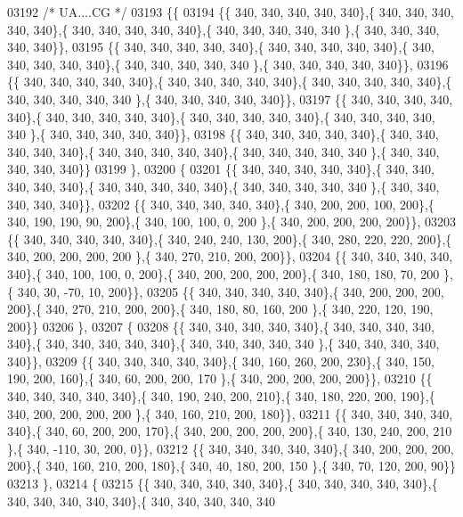 \begin{DoxyCode}
03192 \textcolor{comment}{/* UA....CG */}
03193 \{\{
03194 \{\{ 340, 340, 340, 340, 340\},\{ 340, 340, 340, 340, 340\},\{ 340, 340, 340, 340, 340\},\{ 340, 340, 340, 340, 340
      \},\{ 340, 340, 340, 340, 340\}\},
03195 \{\{ 340, 340, 340, 340, 340\},\{ 340, 340, 340, 340, 340\},\{ 340, 340, 340, 340, 340\},\{ 340, 340, 340, 340, 340
      \},\{ 340, 340, 340, 340, 340\}\},
03196 \{\{ 340, 340, 340, 340, 340\},\{ 340, 340, 340, 340, 340\},\{ 340, 340, 340, 340, 340\},\{ 340, 340, 340, 340, 340
      \},\{ 340, 340, 340, 340, 340\}\},
03197 \{\{ 340, 340, 340, 340, 340\},\{ 340, 340, 340, 340, 340\},\{ 340, 340, 340, 340, 340\},\{ 340, 340, 340, 340, 340
      \},\{ 340, 340, 340, 340, 340\}\},
03198 \{\{ 340, 340, 340, 340, 340\},\{ 340, 340, 340, 340, 340\},\{ 340, 340, 340, 340, 340\},\{ 340, 340, 340, 340, 340
      \},\{ 340, 340, 340, 340, 340\}\}
03199 \},
03200 \{
03201 \{\{ 340, 340, 340, 340, 340\},\{ 340, 340, 340, 340, 340\},\{ 340, 340, 340, 340, 340\},\{ 340, 340, 340, 340, 340
      \},\{ 340, 340, 340, 340, 340\}\},
03202 \{\{ 340, 340, 340, 340, 340\},\{ 340, 200, 200, 100, 200\},\{ 340, 190, 190,  90, 200\},\{ 340, 100, 100,   0, 200
      \},\{ 340, 200, 200, 200, 200\}\},
03203 \{\{ 340, 340, 340, 340, 340\},\{ 340, 240, 240, 130, 200\},\{ 340, 280, 220, 220, 200\},\{ 340, 200, 200, 200, 200
      \},\{ 340, 270, 210, 200, 200\}\},
03204 \{\{ 340, 340, 340, 340, 340\},\{ 340, 100, 100,   0, 200\},\{ 340, 200, 200, 200, 200\},\{ 340, 180, 180,  70, 200
      \},\{ 340,  30, -70,  10, 200\}\},
03205 \{\{ 340, 340, 340, 340, 340\},\{ 340, 200, 200, 200, 200\},\{ 340, 270, 210, 200, 200\},\{ 340, 180,  80, 160, 200
      \},\{ 340, 220, 120, 190, 200\}\}
03206 \},
03207 \{
03208 \{\{ 340, 340, 340, 340, 340\},\{ 340, 340, 340, 340, 340\},\{ 340, 340, 340, 340, 340\},\{ 340, 340, 340, 340, 340
      \},\{ 340, 340, 340, 340, 340\}\},
03209 \{\{ 340, 340, 340, 340, 340\},\{ 340, 160, 260, 200, 230\},\{ 340, 150, 190, 200, 160\},\{ 340,  60, 200, 200, 170
      \},\{ 340, 200, 200, 200, 200\}\},
03210 \{\{ 340, 340, 340, 340, 340\},\{ 340, 190, 240, 200, 210\},\{ 340, 180, 220, 200, 190\},\{ 340, 200, 200, 200, 200
      \},\{ 340, 160, 210, 200, 180\}\},
03211 \{\{ 340, 340, 340, 340, 340\},\{ 340,  60, 200, 200, 170\},\{ 340, 200, 200, 200, 200\},\{ 340, 130, 240, 200, 210
      \},\{ 340, -110,  30, 200,   0\}\},
03212 \{\{ 340, 340, 340, 340, 340\},\{ 340, 200, 200, 200, 200\},\{ 340, 160, 210, 200, 180\},\{ 340,  40, 180, 200, 150
      \},\{ 340,  70, 120, 200,  90\}\}
03213 \},
03214 \{
03215 \{\{ 340, 340, 340, 340, 340\},\{ 340, 340, 340, 340, 340\},\{ 340, 340, 340, 340, 340\},\{ 340, 340, 340, 340, 340

\end{DoxyCode}
